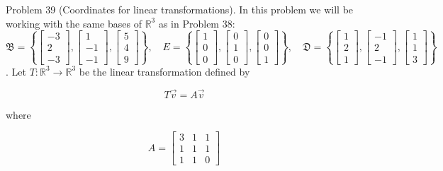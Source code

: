 \documentclass[10pt]{article}
\begin{document}
Problem 39 (Coordinates for linear transformations). In this problem we will be working with the same bases of $\mathbb{R}^{3}$ as in Problem 38:\\
$\mathfrak{B}=\left\{\left[\begin{array}{c}-3 \\ 2 \\ -3\end{array}\right],\left[\begin{array}{c}1 \\ -1 \\ -1\end{array}\right],\left[\begin{array}{l}5 \\ 4 \\ 9\end{array}\right]\right\}, \quad E=\left\{\left[\begin{array}{l}1 \\ 0 \\ 0\end{array}\right],\left[\begin{array}{l}0 \\ 1 \\ 0\end{array}\right],\left[\begin{array}{l}0 \\ 0 \\ 1\end{array}\right]\right\}, \quad \mathfrak{D}=\left\{\left[\begin{array}{l}1 \\ 2 \\ 1\end{array}\right],\left[\begin{array}{c}-1 \\ 2 \\ -1\end{array}\right],\left[\begin{array}{l}1 \\ 1 \\ 3\end{array}\right]\right\}$\\
. Let $T: \mathbb{R}^{3} \rightarrow \mathbb{R}^{3}$ be the linear transformation defined by

$$
T \vec{v}=A \vec{v}
$$

where

$$
A=\left[\begin{array}{lll}
3 & 1 & 1 \\
1 & 1 & 1 \\
1 & 1 & 0
\end{array}\right]
$$
\end{document}
